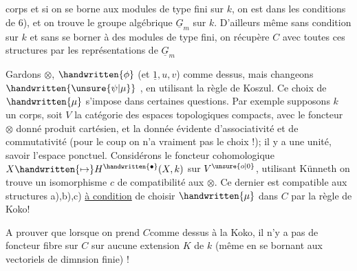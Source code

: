 
corps et si on se borne aux modules de type fini sur $k$, on est dans les conditions de 6), et on trouve le groupe algébrique $\underline{G}_m$ sur $k$. D'ailleurs même sans condition sur $k$ et sans se borner à des modules de type fini, on récupère $C$ avec toutes ces structures par les représentations de $\underline{G}_m$

Gardons $\otimes$, $\handwritten{\phi}$ (et $\underline{1},u,v$) comme dessus, mais changeons $\handwritten{\unsure{\psi|\mu}}$ , en  utilisant la règle de Koszul. Ce choix de $\handwritten{\mu}$ s'impose dans certaines questions. Par exemple supposons $k$ un corps,  soit $V$ la catégorie des espaces topologiques compacts, avec le foncteur $\otimes$ donné  produit cartésien, et la donnée évidente d'associativité et de commutativité (pour le coup on n'a vraiment pas le choix !); il y a une unité,  savoir l'espace ponctuel. Considérons le foncteur cohomologique $X\handwritten{\mapsto}H^{\handwritten{\bullet}}(X,k)$ sur $V^{\unsure{o|0}}$, utilisant Künneth on trouve un isomorphisme $c$ de compatibilité aux $\otimes$. Ce dernier est compatible aux structures a),b),c) \uline{à condition} de choisir $\handwritten{\mu}$ dans $C$ par la règle de Koko!

A prouver que lorsque on prend $C$comme dessus à la Koko, il n'y a pas de foncteur fibre sur $C$ sur aucune extension $K$ de $k$ (même en se bornant aux vectoriels de dimnsion finie) !



